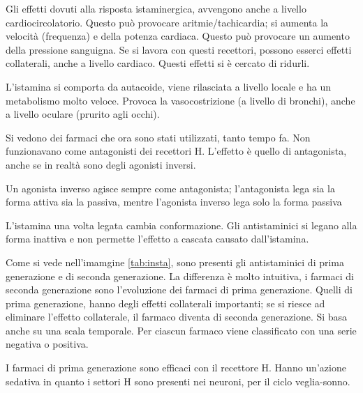Gli effetti dovuti alla risposta istaminergica, avvengono anche a
livello cardiocircolatorio. Questo può provocare aritmie/tachicardia; si
aumenta la velocità (frequenza) e della potenza cardiaca. Questo può
provocare un aumento della pressione sanguigna.
Se si lavora con questi recettori, possono esserci effetti collaterali,
anche a livello cardiaco. Questi effetti si è cercato di ridurli.

L'istamina si comporta da autacoide, viene rilasciata a livello locale e
ha un metabolismo molto veloce. Provoca la vasocostrizione (a livello di
bronchi), anche a livello oculare (prurito agli occhi).

Si vedono dei farmaci che ora sono stati utilizzati, tanto tempo fa. Non
funzionavano come antagonisti dei recettori H. L'effetto è quello di
antagonista, anche se in realtà sono degli agonisti inversi.

Un agonista inverso agisce sempre come antagonista; l'antagonista lega
sia la forma attiva sia la passiva, mentre l'agonista inverso lega solo
la forma passiva

L'istamina una volta legata cambia conformazione. Gli antistaminici si
legano alla forma inattiva e non permette l'effetto a cascata causato dall'istamina.


Come si vede nell'imamgine \ref{tab:insta}, sono presenti gli antistaminici di prima generazione e di seconda generazione.
La differenza è molto intuitiva, i farmaci di seconda generazione sono
l'evoluzione dei farmaci di prima generazione. Quelli di prima
generazione, hanno degli effetti collaterali importanti; se si riesce ad
eliminare l'effetto collaterale, il farmaco diventa di seconda
generazione. Si basa anche su una scala temporale.
Per ciascun farmaco viene classificato con una serie negativa o
positiva. 

I farmaci di prima generazione sono efficaci con il recettore H.
Hanno un'azione sedativa in quanto i settori H sono presenti nei
neuroni, per il ciclo veglia-sonno.


